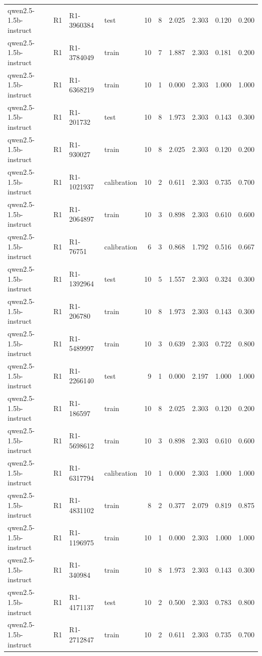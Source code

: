 \begin{table}
\begin{tabular}{llllrrrrrr}
qwen2.5-1.5b-instruct & R1 & R1-3960384 & test & 10 & 8 & 2.025 & 2.303 & 0.120 & 0.200 \\
qwen2.5-1.5b-instruct & R1 & R1-3784049 & train & 10 & 7 & 1.887 & 2.303 & 0.181 & 0.200 \\
qwen2.5-1.5b-instruct & R1 & R1-6368219 & train & 10 & 1 & 0.000 & 2.303 & 1.000 & 1.000 \\
qwen2.5-1.5b-instruct & R1 & R1-201732 & test & 10 & 8 & 1.973 & 2.303 & 0.143 & 0.300 \\
qwen2.5-1.5b-instruct & R1 & R1-930027 & train & 10 & 8 & 2.025 & 2.303 & 0.120 & 0.200 \\
qwen2.5-1.5b-instruct & R1 & R1-1021937 & calibration & 10 & 2 & 0.611 & 2.303 & 0.735 & 0.700 \\
qwen2.5-1.5b-instruct & R1 & R1-2064897 & train & 10 & 3 & 0.898 & 2.303 & 0.610 & 0.600 \\
qwen2.5-1.5b-instruct & R1 & R1-76751 & calibration & 6 & 3 & 0.868 & 1.792 & 0.516 & 0.667 \\
qwen2.5-1.5b-instruct & R1 & R1-1392964 & test & 10 & 5 & 1.557 & 2.303 & 0.324 & 0.300 \\
qwen2.5-1.5b-instruct & R1 & R1-206780 & train & 10 & 8 & 1.973 & 2.303 & 0.143 & 0.300 \\
qwen2.5-1.5b-instruct & R1 & R1-5489997 & train & 10 & 3 & 0.639 & 2.303 & 0.722 & 0.800 \\
qwen2.5-1.5b-instruct & R1 & R1-2266140 & test & 9 & 1 & 0.000 & 2.197 & 1.000 & 1.000 \\
qwen2.5-1.5b-instruct & R1 & R1-186597 & train & 10 & 8 & 2.025 & 2.303 & 0.120 & 0.200 \\
qwen2.5-1.5b-instruct & R1 & R1-5698612 & train & 10 & 3 & 0.898 & 2.303 & 0.610 & 0.600 \\
qwen2.5-1.5b-instruct & R1 & R1-6317794 & calibration & 10 & 1 & 0.000 & 2.303 & 1.000 & 1.000 \\
qwen2.5-1.5b-instruct & R1 & R1-4831102 & train & 8 & 2 & 0.377 & 2.079 & 0.819 & 0.875 \\
qwen2.5-1.5b-instruct & R1 & R1-1196975 & train & 10 & 1 & 0.000 & 2.303 & 1.000 & 1.000 \\
qwen2.5-1.5b-instruct & R1 & R1-340984 & train & 10 & 8 & 1.973 & 2.303 & 0.143 & 0.300 \\
qwen2.5-1.5b-instruct & R1 & R1-4171137 & test & 10 & 2 & 0.500 & 2.303 & 0.783 & 0.800 \\
qwen2.5-1.5b-instruct & R1 & R1-2712847 & train & 10 & 2 & 0.611 & 2.303 & 0.735 & 0.700 \\

\end{tabular}
\end{table}
